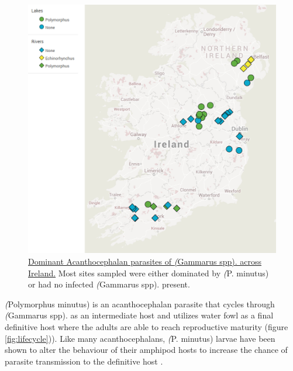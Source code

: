 
\begin{figure}[H] %
	  \centering
	  \includegraphics[keepaspectratio,totalheight=0.8\textheight]{figures/ch1/acanth_map.png}
	    \caption[Dominant Acanthocephalan parasites of \emph(Gammarus spp). across Ireland] 
	    {\underline{Dominant Acanthocephalan parasites of \emph(Gammarus spp). across Ireland.} Most sites sampled were either dominated by \emph(P. minutus) or had no infected \emph(Gammarus spp). present.}
	  \label{fig:acanth_map}
	\end{figure}
	

\emph(Polymorphus minutus) is an acanthocephalan parasite that cycles through \emph(Gammarus spp). as an intermediate host and utilizes water fowl as a final definitive host where the adults are able to reach reproductive maturity (figure \ref{fig:lifecycle})). Like many acanthocephalans, \emph(P. minutus) larvae have been shown to alter the behaviour of their amphipod hosts to increase the chance of parasite transmission to the definitive host \citep{jacquin2014, labaude2017}. 

